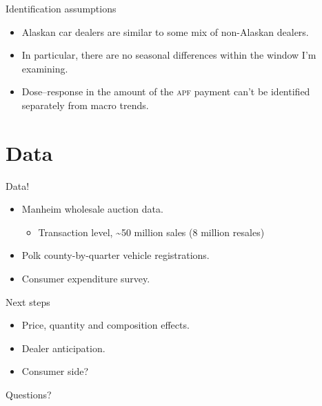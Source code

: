 \documentclass[aspectratio=169]{beamer}
\begin{document}
\begin{frame}{Identification assumptions}
	\begin{itemize}
		\item Alaskan car dealers are similar to some mix of non-Alaskan dealers.
		\item In particular, there are no seasonal differences within the window I'm examining.
		\item Dose--response in the amount of the \textsc{apf} payment can't be identified separately from macro trends.
	\end{itemize}
\end{frame}

\section{Data}
\begin{frame}{Data!}
	\begin{itemize}
		\item Manheim wholesale auction data.
		\begin{itemize}
			\item Transaction level, \textasciitilde 50 million sales (8 million resales)
		\end{itemize}
		\item Polk county-by-quarter vehicle registrations.
		\item Consumer expenditure survey.
	\end{itemize}
\end{frame}

\begin{frame}{Next steps}
	\begin{itemize}
		\item Price, quantity and composition effects.
		\item Dealer anticipation.
		\item Consumer side?
	\end{itemize}
\end{frame}
\begin{frame}
\LARGE Questions?
\end{frame}
\end{document}
